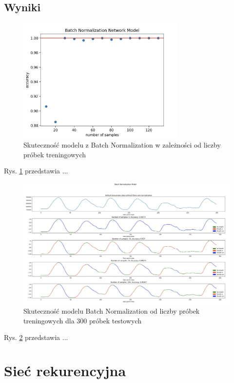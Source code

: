 \documentclass{article}
\begin{document}
\subsection{Wyniki}

\begin{figure}[H]
    \centering
    \includegraphics[width=0.75\textwidth]{batch_normalization/dokladnosc.png}
    \caption{Skuteczność modelu z Batch Normalization w zależności od liczby próbek treningowych}
    \label{fig:data_chart6}
\end{figure}

Rys. \ref{fig:data_chart6} przedstawia ...

\begin{figure}[H]
    \centering
    \includegraphics[width=\textwidth]{batch_normalization/skutecznosc.png}
    \caption{Skuteczność modelu Batch Normalization od liczby próbek treningowych dla 300 próbek testowych}
    \label{fig:data_chart7}
\end{figure}

Rys. \ref{fig:data_chart7} przedstawia ...


\section{Sieć rekurencyjna}
\end{document}
